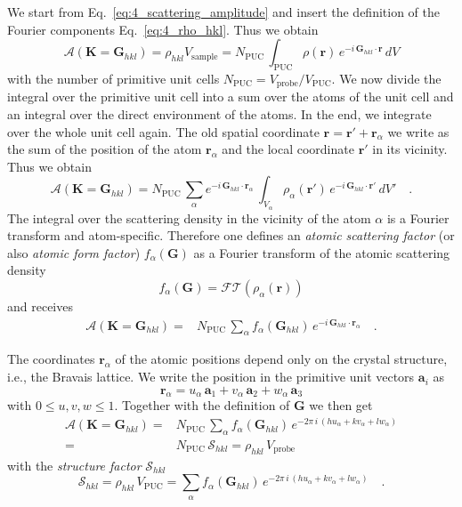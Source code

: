 We start from Eq.~\ref{eq:4_scattering_amplitude} and insert the definition of the Fourier components Eq.~\ref{eq:4_rho_hkl}. Thus we obtain
\begin{equation}
\mathcal{A}(\mathbf{K} = \mathbf{G}_{hkl} ) 
= \rho_{hkl} V_\text{sample}
= N_\text{PUC} \, \int_\text{PUC}    \rho(\mathbf{r})\, e^{-i \, \mathbf{G}_{hkl} \cdot \mathbf{r}} \, dV 
\end{equation}
with the number of primitive unit cells $ N_\text{PUC} = V_\text{probe} / V_\text{PUC}$.
We now divide the integral over the primitive unit cell into a sum over the atoms of the unit cell and an integral over the direct environment of the atoms. In the end, we integrate over the whole unit cell again. The old spatial coordinate $\mathbf{r} = \mathbf{r}' + \mathbf{r}_\alpha$ we write as the sum of the position of the atom $\mathbf{r}_\alpha$ and the local coordinate $\mathbf{r}'$ in its vicinity. Thus we obtain
\begin{equation}
\mathcal{A}(\mathbf{K} = \mathbf{G}_{hkl} ) 
= N_\text{PUC}  \, 
\sum_\alpha e^{-i \, \mathbf{G}_{hkl} \cdot \mathbf{r}_\alpha} \, \int_{V_\alpha}  
 \rho_\alpha(\mathbf{r'})\, e^{-i \, \mathbf{G}_{hkl} \cdot \mathbf{r'}} \, dV' \quad .
\end{equation}
The integral over the scattering density in the vicinity of the atom $\alpha$ is a Fourier transform and atom-specific. Therefore one defines an \emph{atomic scattering factor} (or also \emph{atomic form factor}) $f_\alpha ( \mathbf{G} )$ as a Fourier transform of the atomic scattering density
\begin{equation}
  f_\alpha ( \mathbf{G} ) = \mathcal{FT} (\rho_\alpha(\mathbf{r}))
\end{equation}
and receives
\begin{align}
  \mathcal{A}(\mathbf{K} = \mathbf{G}_{hkl} ) 
  = &
   N_\text{PUC} \, 
  \sum_\alpha f_\alpha ( \mathbf{G}_{hkl} ) \, e^{-i \, \mathbf{G}_{hkl} \cdot \mathbf{r}_\alpha}   \quad .
  \end{align}

The coordinates $\mathbf{r}_\alpha$ of the atomic positions depend only on the crystal structure, i.e., the Bravais lattice. We write the position in the primitive unit vectors $\mathbf{a}_i$ as
\begin{equation}
\mathbf{r}_\alpha = u_\alpha \, \mathbf{a}_1 + v_\alpha \, \mathbf{a}_2 + w_\alpha \, \mathbf{a}_3
\end{equation}
with $0 \le u,v,w \le 1$. Together with the definition of $ \mathbf{G}$ we then get 
\begin{align}
\mathcal{A}(\mathbf{K} = \mathbf{G}_{hkl} ) 
 = &
  N_\text{PUC}  \, 
\sum_\alpha f_\alpha ( \mathbf{G}_{hkl} ) \, e^{-2 \pi \, i \, ( h u_\alpha + k v_\alpha + l w_\alpha ) } \\
 = &
 N_\text{PUC} \, \mathcal{S}_{hkl} = \rho_{hkl} \, V_\text{probe} 
\end{align}
with the \emph{structure factor} $\mathcal{S}_{hkl} $
\begin{equation}
  \mathcal{S}_{hkl} = \rho_{hkl} \, V_\text{PUC} = \sum_\alpha f_\alpha ( \mathbf{G}_{hkl} ) \, e^{-2 \pi \, i \, ( h u_\alpha + k v_\alpha + l w_\alpha ) }  \quad .
\end{equation}


